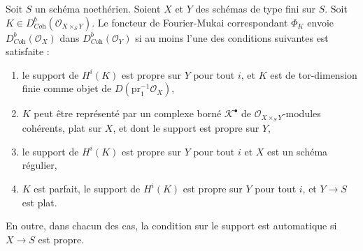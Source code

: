 \begin{lemma}
\label{lemma-fourier-mukai-Coh}
Soit $S$ un schéma noethérien. Soient $X$ et $Y$ des schémas de type fini
sur $S$. Soit $K \in D^b_{\textit{Coh}}(\mathcal{O}_{X \times_S Y})$.
Le foncteur de Fourier-Mukai correspondant $\Phi_K$ envoie
$D^b_{\textit{Coh}}(\mathcal{O}_X)$ dans $D^b_{\textit{Coh}}(\mathcal{O}_Y)$
si au moins l'une des conditions suivantes est satisfaite :
\begin{enumerate}
\item le support de $H^i(K)$ est propre sur $Y$ pour tout $i$, et $K$
est de tor-dimension finie comme objet de $D(\text{pr}_1^{-1}\mathcal{O}_X)$,
\item $K$ peut être représenté par un complexe borné $\mathcal{K}^\bullet$
de $\mathcal{O}_{X \times_S Y}$-modules cohérents, plat sur $X$, et dont le support
est propre sur $Y$,
\item le support de $H^i(K)$ est propre sur $Y$ pour tout $i$
et $X$ est un schéma régulier,
\item $K$ est parfait, le support de $H^i(K)$ est propre sur $Y$ pour tout $i$,
et $Y \to S$ est plat.
\end{enumerate}
En outre, dans chacun des cas, la condition sur le support est automatique
si $X \to S$ est propre.
\end{lemma}

